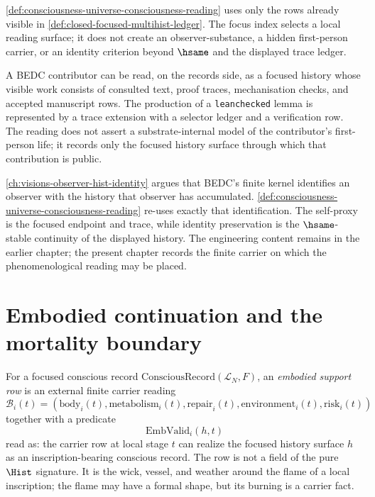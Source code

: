 \begin{principle}
\label{prin:consciousness-universe-no-extra-content}
\autoref{def:consciousness-universe-consciousness-reading} uses only the rows already visible in \autoref{def:closed-focused-multihist-ledger}. The focus index selects a local reading surface; it does not create an observer-substance, a hidden first-person carrier, or an identity criterion beyond $\hsame$ and the displayed trace ledger.
\end{principle}

\begin{example}
\label{ex:consciousness-universe-bedc-author}
A BEDC contributor can be read, on the records side, as a focused history whose visible work consists of consulted text, proof traces, mechanisation checks, and accepted manuscript rows. The production of a \texttt{leanchecked} lemma is represented by a trace extension with a selector ledger and a verification row. The reading does not assert a substrate-internal model of the contributor's first-person life; it records only the focused history surface through which that contribution is public.
\end{example}

\begin{remark}
\label{rem:consciousness-universe-relation-implicit-metaphysics}
\autoref{ch:visions-observer-hist-identity} argues that BEDC's finite kernel identifies an observer with the history that observer has accumulated. \autoref{def:consciousness-universe-consciousness-reading} re-uses exactly that identification. The self-proxy is the focused endpoint and trace, while identity preservation is the $\hsame$-stable continuity of the displayed history. The engineering content remains in the earlier chapter; the present chapter records the finite carrier on which the phenomenological reading may be placed.
\end{remark}

\section{Embodied continuation and the mortality boundary}
\label{sec:consciousness-universe-embodied-continuation-mortality}

\begin{definition}
\label{def:consciousness-universe-embodied-support-row}
For a focused conscious record $\mathrm{ConsciousRecord}(\mathcal{L}_N,F)$, an \emph{embodied support row} is an external finite carrier reading
$$
\mathcal{B}_i(t)=(\mathrm{body}_i(t),\mathrm{metabolism}_i(t),\mathrm{repair}_i(t),\mathrm{environment}_i(t),\mathrm{risk}_i(t))
$$
together with a predicate
$$
\mathrm{EmbValid}_i(h,t)
$$
read as: the carrier row at local stage $t$ can realize the focused history surface $h$ as an inscription-bearing conscious record. The row is not a field of the pure $\Hist$ signature. It is the wick, vessel, and weather around the flame of a local inscription; the flame may have a formal shape, but its burning is a carrier fact.
\end{definition}

